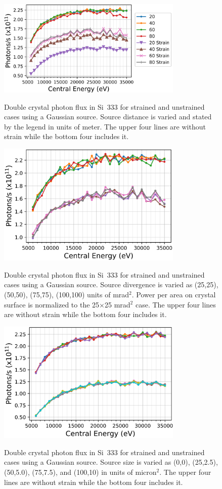 \documentclass{iucr}
\begin{document}
\begin{figure}
\caption{Double crystal photon flux in Si~333 for strained and unstrained cases using a Gaussian source. Source distance is varied and stated by the legend in units of meter. The upper four lines are without strain while the bottom four includes it.}
\includegraphics[width = 8.85cm]{images/333straindistance.png}
\label{fig:333straindistance}
\end{figure}

\begin{figure}
\caption{Double crystal photon flux in Si~333 for strained and unstrained cases using a Gaussian source. Source divergence is varied as (25,25), (50,50), (75,75), (100,100) units of mrad$^2$. Power per area on crystal surface is normalized to the 25$\times$25 mrad$^2$ case. The upper four lines are without strain while the bottom four includes it.}
\includegraphics[width = 8.85cm]{images/333straindivergence.png}
\label{fig:333straindivergence}
\end{figure}

\begin{figure}
\caption{Double crystal photon flux in Si~333 for strained and unstrained cases using a Gaussian source. Source size is varied as (0,0), (25,2.5), (50,5.0), (75,7.5), and (100,10) in units of micron$^2$. The upper four lines are without strain while the bottom four includes it.}
\includegraphics[width = 8.85cm]{images/333strainsize.png}
\label{fig:333strainsourcesize}
\end{figure}
\end{document}
